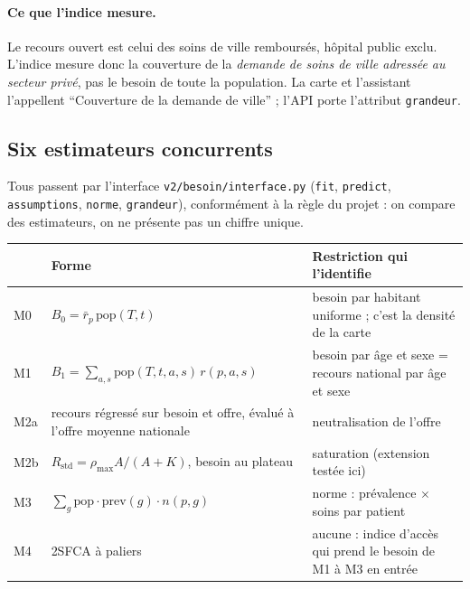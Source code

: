 \paragraph{Ce que l'indice mesure.} Le recours ouvert est celui des soins de ville remboursés, hôpital public exclu.
L'indice mesure donc la couverture de la \emph{demande de soins de ville adressée au secteur privé}, pas le besoin de
toute la population. La carte et l'assistant l'appellent \enquote{Couverture de la demande de ville} ; l'API porte
l'attribut \texttt{grandeur}.

\subsection{Six estimateurs concurrents}\label{bes:estimateurs}
Tous passent par l'interface \texttt{v2/besoin/interface.py} (\texttt{fit}, \texttt{predict}, \texttt{assumptions},
\texttt{norme}, \texttt{grandeur}), conformément à la règle du projet : on compare des estimateurs, on ne présente
pas un chiffre unique.

\begin{center}\small
\begin{tabularx}{\linewidth}{@{}l X X@{}}
\toprule
& \textbf{Forme} & \textbf{Restriction qui l'identifie} \\
\midrule
M0 & $B_0=\bar r_p\,\mathrm{pop}(T,t)$ & besoin par habitant uniforme ; c'est la densité de la carte \\
M1 & $B_1=\sum_{a,s}\mathrm{pop}(T,t,a,s)\,r(p,a,s)$ & besoin par âge et sexe = recours national par âge et sexe \\
M2a & recours régressé sur besoin et offre, évalué à l'offre moyenne nationale & neutralisation de l'offre~\citep{carrhill1994,gravelle2003} \\
M2b & $R_{\mathrm{std}}=\rho_{\max}A/(A+K)$, besoin au plateau & saturation (extension testée ici) \\
M3 & $\sum_g \mathrm{pop}\cdot\mathrm{prev}(g)\cdot n(p,g)$ & norme : prévalence $\times$ soins par patient~\citep{birch2007,mackenzie2019} \\
M4 & 2SFCA à paliers & aucune : indice d'accès qui prend le besoin de M1 à M3 en entrée~\citep{luowang2003,luo2009} \\
\bottomrule
\end{tabularx}
\end{center}

